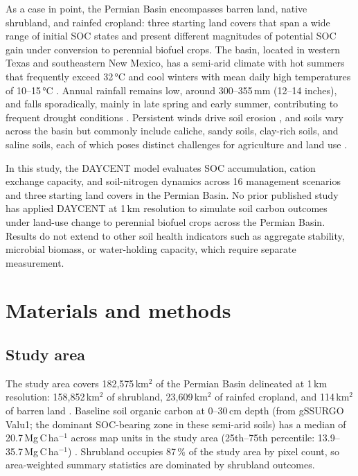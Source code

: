 \documentclass[11pt]{article}
\begin{document}
As a case in point, the Permian Basin encompasses barren land, native shrubland, and rainfed cropland: three starting land covers that span a wide range of initial SOC states and present different magnitudes of potential SOC gain under conversion to perennial biofuel crops. The basin, located in western Texas and southeastern New Mexico, has a semi-arid climate with hot summers that frequently exceed 32\,°C and cool winters with mean daily high temperatures of 10--15\,°C \citep{PermianBasinClimatePlaceholder}.
Annual rainfall remains low, around 300--355\,mm (12--14 inches), and falls sporadically, mainly in late spring and early summer, contributing to frequent drought conditions \citep{PermianBasinClimatePlaceholder}. Persistent winds drive soil erosion \citep{Naorem2023Placeholder}, and soils vary across the basin but commonly include caliche, sandy soils, clay-rich soils, and saline soils, each of which poses distinct challenges for agriculture and land use \citep{NRCSgSSURGOPlaceholder}.

In this study, the DAYCENT model \citep{Parton1998DAYCENT} evaluates SOC accumulation, cation exchange capacity, and soil-nitrogen dynamics across 16 management scenarios and three starting land covers in the Permian Basin. No prior published study has applied DAYCENT at 1\,km resolution to simulate soil carbon outcomes under land-use change to perennial biofuel crops across the Permian Basin. Results do not extend to other soil health indicators such as aggregate stability, microbial biomass, or water-holding capacity, which require separate measurement.

\section*{Materials and methods}

\subsection*{Study area}

The study area covers 182,575\,km$^2$ of the Permian Basin delineated at 1\,km resolution: 158,852\,km$^2$ of shrubland, 23,609\,km$^2$ of rainfed cropland, and 114\,km$^2$ of barren land \citep{PermianBasinBoundaryUSGS}.
Baseline soil organic carbon at 0--30\,cm depth (from gSSURGO Valu1; the dominant SOC-bearing zone in these semi-arid soils) has a median of 20.7\,Mg\,C\,ha$^{-1}$ across map units in the study area (25th--75th percentile: 13.9--35.7\,Mg\,C\,ha$^{-1}$) \citep{NRCSgSSURGOPlaceholder}. Shrubland occupies 87\,\% of the study area by pixel count, so area-weighted summary statistics are dominated by shrubland outcomes.
\end{document}
